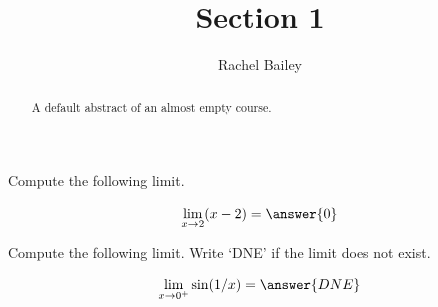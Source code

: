 \documentclass{ximera}
\title{Section 1}
\author{Rachel Bailey}
\begin{document}
\begin{abstract}
    A default abstract of an almost empty course.
\end{abstract}
\maketitle


\begin{exercise}
Compute the following limit.
\begin{prompt}
\[
\lim\limits_{x\to 2} (x-2) = \answer{0}
\]
\end{prompt}    
\end{exercise}



\begin{exercise}
Compute the following limit. Write `DNE' if the limit does not exist.
\begin{prompt}
\[
\lim\limits_{x\to 0^+} \sin(1/x) = \answer{DNE}
\]
\end{prompt}    
\end{exercise}
\end{document}
